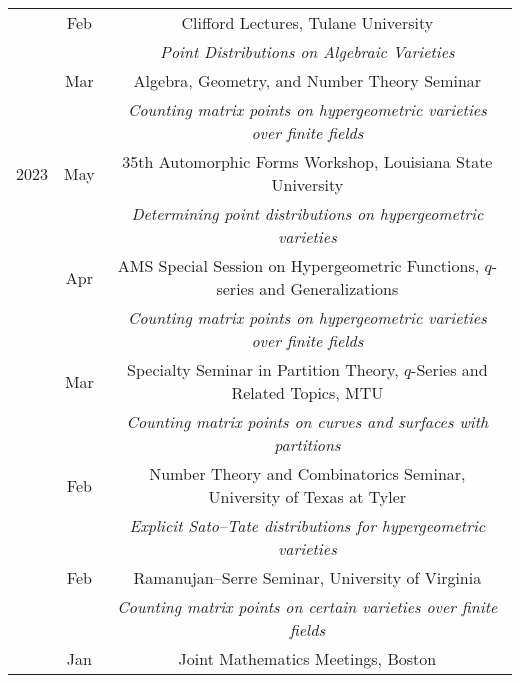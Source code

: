 \documentclass[11pt]{amsart}
\theoremstyle{remark}
\begin{document}
{\bgroup
\def\arraystretch{1.3}
\begin{tabular}{ c c c }
	& Feb & \hspace{-3.1in}Clifford Lectures, Tulane University \\
	&     & \hspace{-2.64in}\textit{Point Distributions on Algebraic Varieties} \\
	& Mar & \hspace{-2.2in} Algebra, Geometry, and Number Theory Seminar\\
	&     & \hspace{-0.9in}\textit{Counting matrix points on hypergeometric varieties over finite fields} \\
2023 & May & \hspace{-1.2in} 35th Automorphic Forms Workshop, Louisiana State University \\
     &     & \hspace{-1.45in}\textit{Determining point distributions on hypergeometric varieties} \\
     & Apr & AMS Special Session on Hypergeometric Functions, $q$-series and Generalizations \\
     &     & \hspace{-0.9in}\textit{Counting matrix points on hypergeometric varieties over finite fields} \\
     & Mar & \hspace{-0.45in}Specialty Seminar in Partition Theory, $q$-Series and Related Topics, MTU \\
     &     & \hspace{-1.4in}\textit{Counting matrix points on curves and surfaces with partitions} \\
     & Feb & \hspace{-0.53in} Number Theory and Combinatorics Seminar, University of Texas at Tyler \\
     &      & \hspace{-1.5in}\textit{Explicit Sato--Tate distributions for hypergeometric varieties} \\
     & Feb  & \hspace{-2.3in} Ramanujan--Serre Seminar, University of Virginia \\
     &      & \hspace{-1.5in}\textit{Counting matrix points on certain varieties over finite fields} \\
     &  Jan & \hspace{-3.13in}Joint Mathematics Meetings, Boston \\

\end{tabular}}
\end{document}
